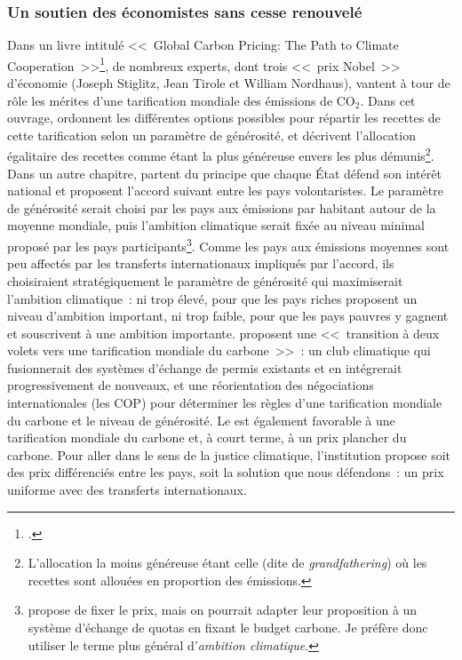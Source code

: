 \documentclass[a5paper,french,openany]{memoir}
\begin{document}
\subsubsection{Un soutien des économistes sans cesse renouvelé}
Dans un livre intitulé <<~Global Carbon Pricing: The Path to Climate Cooperation~>>\footnote{\citet{cramton_global_2017}.}, de nombreux experts, dont trois <<~prix Nobel~>> d'économie (Joseph Stiglitz, Jean Tirole et William Nordhaus), vantent à tour de rôle les mérites d'une tarification mondiale des émissions de CO$_\text{2}$. Dans cet ouvrage, \citet{gollier_negotiating_2015} ordonnent les différentes options possibles pour répartir les recettes de cette tarification selon un paramètre de générosité, et décrivent l'allocation égalitaire des recettes comme étant la plus généreuse envers les plus démunis\footnote{L'allocation la moins généreuse étant celle (dite de \textit{grandfathering}) où les recettes sont allouées en proportion des émissions.}. 
Dans un autre chapitre, \citet{cramton_international_2015} partent du principe que chaque État défend son intérêt national et proposent l'accord suivant entre les pays %
volontaristes. %
Le paramètre de générosité serait choisi par les pays aux émissions par habitant autour de la moyenne mondiale, puis l'ambition climatique serait fixée au niveau minimal proposé par les pays participants\footnote{\citet{cramton_international_2015} propose de fixer le prix, mais on pourrait adapter leur proposition à un système d'échange de quotas en fixant le budget carbone. Je préfère donc utiliser le terme plus général d'\textit{ambition climatique}.}. Comme les pays aux émissions moyennes sont peu affectés par les transferts internationaux impliqués par l'accord, ils choisiraient stratégiquement le paramètre de générosité qui maximiserait l'ambition climatique~: ni trop élevé, pour que les pays riches proposent un niveau d'ambition important, ni trop faible, pour que les pays pauvres y gagnent et souscrivent à une ambition importante. \citet{van_den_berg_implications_2020} proposent une <<~transition à deux volets vers une tarification mondiale du carbone~>>~: un club climatique qui fusionnerait des systèmes d'échange de permis existants et en intégrerait progressivement de nouveaux, et une réorientation des négociations internationales (les COP) pour déterminer les règles d'une tarification mondiale du carbone et le niveau de générosité. Le \citet{fmi_how_2019} est également favorable à une tarification mondiale du carbone et, à court terme, à un prix plancher du carbone. Pour aller dans le sens de la justice climatique, l'institution propose soit des prix différenciés entre les pays, soit la solution que nous défendons~: un prix uniforme avec des transferts internationaux. 
\end{document}
